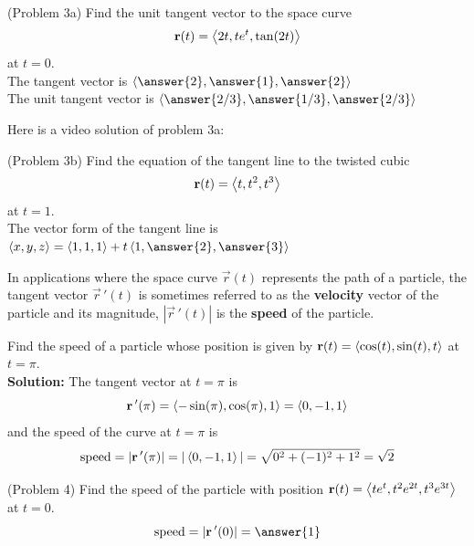 \documentclass[handout]{ximera}
\begin{document}
\begin{center}
\end{center}


\begin{problem}(Problem 3a)
Find the unit tangent vector to the space curve
\[
\mathbf r(t) = \left\langle 2t, te^t, \tan(2t)\right\rangle
\]
at $t = 0$.\\
The tangent vector is $\vector{\answer{2}, \answer{1}, \answer{2}}$\\
The unit tangent vector is $\vector{\answer{2/3}, \answer{1/3}, \answer{2/3}}$
\end{problem}

Here is a video solution of problem 3a:\\
\begin{foldable}
\end{foldable}

\begin{problem}(Problem 3b)
Find the equation of the tangent line to the twisted cubic
\[
\mathbf r(t) = \left\langle t, t^2, t^3\right\rangle
\]
at $t = 1$.\\
The vector form of the tangent line is $\vector{x, y, z} = \vector{1,1,1} + t\vector{1, \answer{2}, \answer{3}}$\\
\end{problem}

\begin{center}
\end{center}

In applications where the space curve $\vec r(t)$ represents the path of a particle, the tangent vector $\vec r\,'(t)$ is sometimes referred to as the \textbf{velocity} vector
of the particle and its magnitude, $|\vec r\,'(t)|$ is the \textbf{speed} of the particle.

\begin{example}[Example 4]
Find the speed of a particle whose position is given by $\mathbf r(t) = \left\langle \cos(t), \sin(t), t\right\rangle$ at $t = \pi$.\\
\textbf {Solution:} The tangent vector at $ t = \pi$ is
\[
\mathbf r\,'(\pi) = \left\langle -\sin(\pi), \cos(\pi), 1\right\rangle = \left\langle 0, -1, 1\right\rangle
\]
and the speed of the curve at $t = \pi$ is
\[
\text{speed} = |\mathbf r\,'(\pi)| =|\left\langle 0, -1, 1\right\rangle| = \sqrt{0^2 + (-1)^2 + 1^2} = \sqrt 2
\]
\end{example}


\begin{problem}(Problem 4) 
Find the speed of the particle with position $\mathbf r(t) = \left\langle te^t, t^2e^{2t}, t^3e^{3t}\right\rangle$ at $t = 0$.\\
\[
\text{speed} = |\vec r\,'(0)| = \answer{1}
\]
\end{problem}
\end{document}
